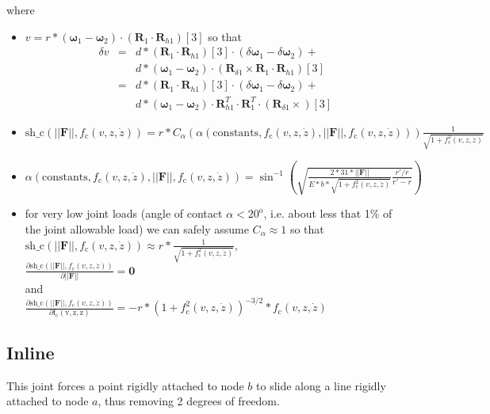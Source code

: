 \documentclass[10pt,dvips,fleqn,subeqn]{report}
\newcommand{\T}[1]{\bm{#1}}
\begin{document}
where
\begin{itemize}
\item
$v=r * (\T \omega_{1}-\T \omega_{2})\cdot(\T R_1\cdot \T R_{h1})[3]$
so that
\begin{eqnarray*}
\delta v &=& d * (\T R_1\cdot \T R_{h1})[3] \cdot (\delta \T \omega_{1}- \delta \T \omega_{2}) +\\
	&& d * (\T \omega_{1}-\T \omega_{2})\cdot (\T R_{\delta 1} \times \T R_1 \cdot \T R_{h1})[3]\\
	&=& d * (\T R_1\cdot \T R_{h1})[3] \cdot (\delta \T \omega_{1}- \delta \T \omega_{2}) +\\
	&& d * (\T \omega_{1}-\T \omega_{2})\cdot \T R_{h1}^T \cdot \T R_1^T \cdot (\T R_{\delta 1} \times )[3]
\end{eqnarray*}
\item
$
\mathrm{sh\_c}(||\T F||, f_{\mathrm{c}}(v,z,\dot{z}))=
r * 
C_\alpha(
	\alpha(\mathrm{constants},
		f_{\mathrm{c}}(v,z,\dot{z}),
		||\T F||,
		f_{\mathrm{c}}(v,z,\dot{z})
	)
) 
\frac{\displaystyle 1}{\displaystyle \sqrt{1+f_{\mathrm{c}}^2(v,z,\dot{z})}}
$
\item
$
\alpha(\mathrm{constants},
	f_{\mathrm{c}}(v,z,\dot{z}),
	||\T F||,
	f_{\mathrm{c}}(v,z,\dot{z})
) =
\sin^{-1}\left(
	\sqrt{
		\frac{\displaystyle 2*31*||\T F||}
			{\displaystyle E*b*\sqrt{1+f_{\mathrm{c}}^2(v,z,\dot{z})}}
		\frac{\displaystyle r'/r}
			{\displaystyle r'-r}
	}
\right)
$
\item for very low joint loads (angle of contact $\alpha< 20^{\mathrm{o}}$,
i.e. about less that 1\% of the joint allowable load)
we can safely assume $C_\alpha\approx 1$
so that\\ 
$
\mathrm{sh\_c}(||\T F||, f_{\mathrm{c}}(v,z,\dot{z}))\approx
r * 
\frac{\displaystyle 1}{\displaystyle \sqrt{1+f_{\mathrm{c}}^2(v,z,\dot{z})}}
$,\\

$
\frac{\displaystyle\partial \mathrm{sh\_c}(||\T F||, f_{\mathrm{c}}(v,z,\dot{z}))}
	{\displaystyle \partial ||\T F||} = \T 0
$\\
and\\
$
\frac{\displaystyle\partial \mathrm{sh\_c}(||\T F||, f_{\mathrm{c}}(v,z,\dot{z}))}
	{\displaystyle\partial \mathrm{f_{\mathrm{c}}(v,z,\dot{z})}} =
	-r * (1+f_{\mathrm{c}}^2(v,z,\dot{z}))^{-3/2}*f_{\mathrm{c}}(v,z,\dot{z})
$
\end{itemize}



\subsection{Inline}
This joint forces a point rigidly attached to node $b$ to slide
along a line rigidly attached to node $a$, thus removing 2 degrees of freedom.
\end{document}
